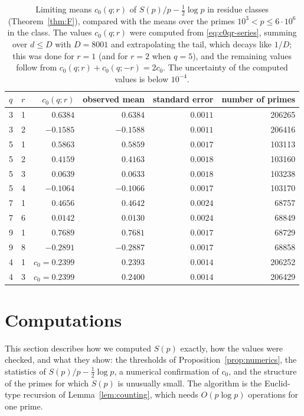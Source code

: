 \begin{table}[ht]
\small
\begin{tabular}{llrrrr}
\toprule
$q$ & $r$ & $c_0(q;r)$ & observed mean & standard error & number of primes\\
\midrule
3 & 1 & $0.6384$ & $0.6384$ & $0.0011$ & 206265\\
3 & 2 & $-0.1585$ & $-0.1588$ & $0.0011$ & 206416\\
5 & 1 & $0.5863$ & $0.5859$ & $0.0017$ & 103113\\
5 & 2 & $0.4159$ & $0.4163$ & $0.0018$ & 103160\\
5 & 3 & $0.0639$ & $0.0633$ & $0.0018$ & 103238\\
5 & 4 & $-0.1064$ & $-0.1066$ & $0.0017$ & 103170\\
7 & 1 & $0.4656$ & $0.4642$ & $0.0024$ & 68757\\
7 & 6 & $0.0142$ & $0.0130$ & $0.0024$ & 68849\\
9 & 1 & $0.7689$ & $0.7681$ & $0.0017$ & 68729\\
9 & 8 & $-0.2891$ & $-0.2887$ & $0.0017$ & 68858\\
4 & 1 & $c_0=0.2399$ & $0.2393$ & $0.0014$ & 206252\\
4 & 3 & $c_0=0.2399$ & $0.2400$ & $0.0014$ & 206429\\
\bottomrule
\end{tabular}
\caption{Limiting means $c_0(q;r)$ of $S(p)/p-\frac12\log p$ in residue classes (Theorem~\ref{thm:F}), compared with the means over the primes $10^3<p\le 6\cdot 10^6$ in the class. The values $c_0(q;r)$ were computed from \eqref{eq:c0qr-series}, summing over $d\le D$ with $D=8001$ and extrapolating the tail, which decays like $1/D$; this was done for $r=1$ (and for $r=2$ when $q=5$), and the remaining values follow from $c_0(q;r)+c_0(q;-r)=2c_0$. The uncertainty of the computed values is below $10^{-4}$.}\label{tab:residue-classes}
\end{table}

\section{Computations}\label{sec:computations}

This section describes how we computed $S(p)$ exactly, how the values were checked, and what they show: the thresholds of Proposition~\ref{prop:numerics}, the statistics of $S(p)/p-\frac12\log p$, a numerical confirmation of $c_0$, and the structure of the primes for which $S(p)$ is unusually small. The algorithm is the Euclid-type recursion of Lemma~\ref{lem:counting}, which needs $O(p\log p)$ operations for one prime.


